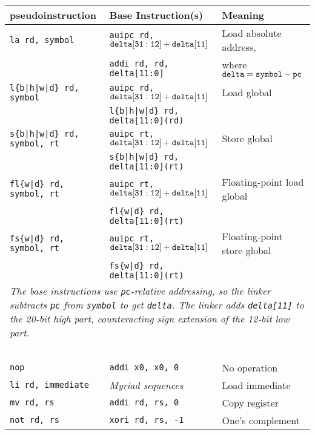 \begin{table}[h]
\begin{small}
\begin{center}
\begin{tabular}{l l l}
pseudoinstruction & Base Instruction(s) & Meaning \\ \hline

\tt la rd, symbol & {\tt auipc rd, ${\tt delta[31:12]} + {\tt delta[11]}$} & Load absolute address, \\
                  & {\tt addi rd, rd, delta[11:0]}                         & where ${\tt delta} = {\tt symbol} - {\tt pc}$ \\[1ex]
\tt l\{b|h|w|d\} rd, symbol & {\tt auipc rd, ${\tt delta[31:12]} + {\tt delta[11]}$} & Load global \\
                            & {\tt l\{b|h|w|d\} rd, delta[11:0](rd)}                 & \\[1ex]
\tt s\{b|h|w|d\} rd, symbol, rt & {\tt auipc rt, ${\tt delta[31:12]} + {\tt delta[11]}$} & Store global \\
                               & {\tt s\{b|h|w|d\} rd, delta[11:0](rt)}                 & \\[1ex]
\tt fl\{w|d\} rd, symbol, rt & {\tt auipc rt, ${\tt delta[31:12]} + {\tt delta[11]}$} & Floating-point load global \\
                             & {\tt fl\{w|d\} rd, delta[11:0](rt)}                    & \\[1ex]
\tt fs\{w|d\} rd, symbol, rt & {\tt auipc rt, ${\tt delta[31:12]} + {\tt delta[11]}$} & Floating-point store global \\
                             & {\tt fs\{w|d\} rd, delta[11:0](rt)}                    & \\[1ex]
\multicolumn{3}{p{.99\textwidth}}{\small \em The base instructions use {\tt pc}-relative addressing, so the linker subtracts {\tt pc} from {\tt symbol} to get {\tt delta}.  The linker adds {\tt delta[11]} to the 20-bit high part, counteracting sign extension of the 12-bit low part.} \\
~\\
\hline
{\tt nop} & {\tt addi x0, x0, 0} & No operation \\
{\tt li rd, immediate} & {\em Myriad sequences} & Load immediate \\
{\tt mv rd, rs} & {\tt addi rd, rs, 0} & Copy register \\
{\tt not rd, rs} & {\tt xori rd, rs, -1} & One's complement \\

\end{tabular}
\end{center}
\end{small}
\end{table}
